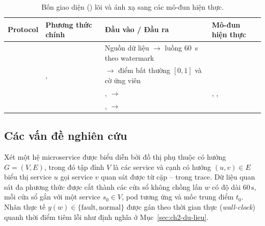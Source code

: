 \begin{table}[htbp]
  \centering
  \caption{Bốn giao diện () lõi và ánh xạ sang các mô-đun hiện thực.}
  \label{tab:ch4-protocols}
  \footnotesize
  \begin{tabularx}{\linewidth}{@{}l l Y Y@{}}
    \toprule
    \textbf{Protocol} & \textbf{Phương thức chính} & \textbf{Đầu vào / Đầu ra} & \textbf{Mô-đun hiện thực} \\
    \midrule
     &  & Nguồn dữ liệu $\to$ luồng  60~s theo watermark &  \\
     & ,  &  $\to$ điểm bất thường $[0, 1]$ và cờ ứng viên &  \\
     &  & ,  $\to$  & , ,  \\
     &  & ,  $\to$  &  \\
    \bottomrule
  \end{tabularx}
\end{table}

\subsection{Các vấn đề nghiên cứu}
\label{sec:ch4-van-de}

Xét một hệ microservice được biểu diễn bởi đồ thị phụ thuộc có hướng $G = (V, E)$, trong đó tập đỉnh $V$ là các service và cạnh có hướng $(u, v) \in E$ biểu thị service $u$ gọi service $v$ quan sát được từ cặp -- trong trace. Dữ liệu quan sát đa phương thức được cắt thành các cửa sổ không chồng lấn $w$ có độ dài $60\,\text{s}$, mỗi cửa sổ gắn với một service $s_0 \in V$, pod tương ứng và mốc trung điểm $t_0$. Nhãn thực tế $y(w) \in \{\text{fault}, \text{normal}\}$ được gán theo thời gian thực (\emph{wall-clock}) quanh thời điểm tiêm lỗi như định nghĩa ở Mục~\ref{sec:ch2-du-lieu}.

